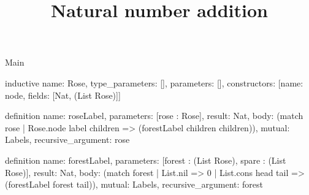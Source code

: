 \begin{lexlean}{Main}
\title{Natural number addition}
\begin{semanticmodule}
inductive{
  name: Rose,
  type_parameters: [],
  parameters: [],
  constructors: [{name: node, fields: [Nat, (List Rose)]}]
}

definition{
  name: roseLabel,
  parameters: [rose : Rose],
  result: Nat,
  body: (match rose | Rose.node label children => (forestLabel children children)),
  mutual: Labels,
  recursive_argument: rose
}

definition{
  name: forestLabel,
  parameters: [forest : (List Rose), spare : (List Rose)],
  result: Nat,
  body: (match forest | List.nil => 0 | List.cons head tail => (forestLabel forest tail)),
  mutual: Labels,
  recursive_argument: forest
}
\end{semanticmodule}
\end{lexlean}
